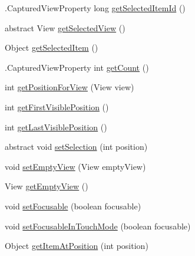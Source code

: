 \begin{DoxyCompactItemize}
\item 
.Captured\+View\+Property long \hyperlink{classit_1_1sephiroth_1_1android_1_1library_1_1widget_1_1_adapter_view_aea3946a289bf00833bbcc4f2281e1bf1}{get\+Selected\+Item\+Id} ()
\item 
abstract View \hyperlink{classit_1_1sephiroth_1_1android_1_1library_1_1widget_1_1_adapter_view_a30c7157929f8e59df1bf687b4fc8a546}{get\+Selected\+View} ()
\item 
Object \hyperlink{classit_1_1sephiroth_1_1android_1_1library_1_1widget_1_1_adapter_view_aba45e9479002d14addd73bc398ddd9fc}{get\+Selected\+Item} ()
\item 
.Captured\+View\+Property int \hyperlink{classit_1_1sephiroth_1_1android_1_1library_1_1widget_1_1_adapter_view_aaaaaeeaf019688a14e82499a294bc9c2}{get\+Count} ()
\item 
int \hyperlink{classit_1_1sephiroth_1_1android_1_1library_1_1widget_1_1_adapter_view_a0177b193e83d643073123fb44ac84ec8}{get\+Position\+For\+View} (View view)
\item 
int \hyperlink{classit_1_1sephiroth_1_1android_1_1library_1_1widget_1_1_adapter_view_a8f6f44a587e3f129705db3f058960bc1}{get\+First\+Visible\+Position} ()
\item 
int \hyperlink{classit_1_1sephiroth_1_1android_1_1library_1_1widget_1_1_adapter_view_a6daccb03d7b64550e42c1bd0291eafad}{get\+Last\+Visible\+Position} ()
\item 
abstract void \hyperlink{classit_1_1sephiroth_1_1android_1_1library_1_1widget_1_1_adapter_view_a37d730d04e7c7ce7687427fa6eb1bce4}{set\+Selection} (int position)
\item 
void \hyperlink{classit_1_1sephiroth_1_1android_1_1library_1_1widget_1_1_adapter_view_a2f5ec6bb3c6230eb984081e1d8bda421}{set\+Empty\+View} (View empty\+View)
\item 
View \hyperlink{classit_1_1sephiroth_1_1android_1_1library_1_1widget_1_1_adapter_view_a5fd13413bb6259fc3d1974db798a4a13}{get\+Empty\+View} ()
\item 
void \hyperlink{classit_1_1sephiroth_1_1android_1_1library_1_1widget_1_1_adapter_view_a9c79c9f7d037fc86477f2d5e4ebc0d03}{set\+Focusable} (boolean focusable)
\item 
void \hyperlink{classit_1_1sephiroth_1_1android_1_1library_1_1widget_1_1_adapter_view_ac6d3cab840204af4d54802fd975aa425}{set\+Focusable\+In\+Touch\+Mode} (boolean focusable)
\item 
Object \hyperlink{classit_1_1sephiroth_1_1android_1_1library_1_1widget_1_1_adapter_view_ae2abb61ac08e8b2ff882b0e5e4fb314f}{get\+Item\+At\+Position} (int position)

\end{DoxyCompactItemize}
